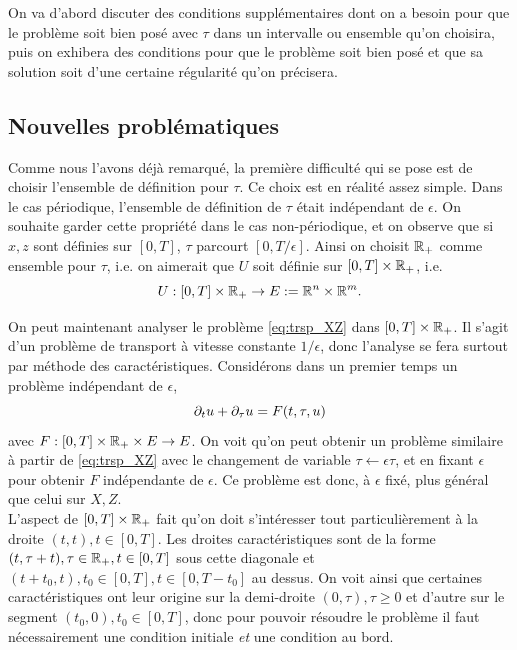 On va d'abord discuter des conditions supplémentaires dont on a besoin pour que le problème soit bien posé avec $\tau$ dans un intervalle ou ensemble qu'on choisira, puis on exhibera des conditions pour que le problème soit bien posé et que sa solution soit d'une certaine régularité qu'on précisera. 


\subsection{Nouvelles problématiques}

Comme nous l'avons déjà remarqué, la première difficulté qui se pose est de choisir l'ensemble de définition pour $\tau$. 
Ce choix est en réalité assez simple. 
Dans le cas périodique, l'ensemble de définition de $\tau$ était indépendant de $\epsilon$. 
On souhaite garder cette propriété dans le cas non-périodique, et on observe que si $x,z$ sont définies sur $[0,T]$, $\tau$ parcourt $[0,T/\epsilon]$. 
Ainsi on choisit $\mathbb{R}_+$ comme ensemble pour $\tau$, i.e. on aimerait que $U$ soit définie sur $[0,T]\times\mathbb{R}_+$, i.e. 
$$ U : [0,T]\times\mathbb{R}_+ \rightarrow E := \mathbb{R}^n\times\mathbb{R}^m . $$

On peut maintenant analyser le problème \eqref{eq:trsp_XZ} dans $[0,T]\times\mathbb{R}_+$. 
Il s'agit d'un problème de transport à vitesse constante $1/\epsilon$, donc l'analyse se fera surtout par méthode des caractéristiques. 
Considérons dans un premier temps un problème indépendant de $\epsilon$, 
$$ \partial_t u + \partial_{\tau} u = F(t,\tau,u) $$
avec $F:[0,T]\times\mathbb{R}_+\times E \rightarrow E$. 
On voit qu'on peut obtenir un problème similaire à partir de \eqref{eq:trsp_XZ} avec le changement de variable $\tau \leftarrow \epsilon\tau$, et en fixant $\epsilon$ pour obtenir $F$ indépendante de $\epsilon$. 
Ce problème est donc, à $\epsilon$ fixé, plus général que celui sur $X,Z$. \\


L'aspect de $[0,T]\times\mathbb{R}_+$ fait qu'on doit s'intéresser tout particulièrement à la droite $(t,t),t\in[0,T]$. 
Les droites caractéristiques sont de la forme $(t,\tau+t),\tau\in\mathbb{R}_+,t\in[0,T]$ sous cette diagonale et $(t+t_0, t),t_0\in[0,T],t\in[0,T-t_0]$ au dessus. 
On voit ainsi que certaines caractéristiques ont leur origine sur la demi-droite $(0,\tau),\tau\geq 0$ et d'autre sur le segment $(t_0,0),t_0\in[0,T]$, 
donc pour pouvoir résoudre le problème il faut nécessairement une condition initiale \textit{et} une condition au bord. 


